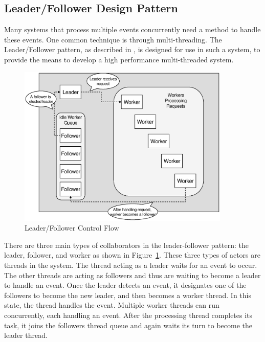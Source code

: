 \subsection{Leader/Follower Design Pattern}
Many systems that process multiple events concurrently need a method to handle 
these events. One common technique is through multi-threading. The 
Leader/Follower pattern, as described in \cite{GangOf4}, is designed for use in
such a system, to provide the means to develop a high performance multi-threaded
system. 

\begin{figure}
  \begin{center}
  \includegraphics[width=0.9\textwidth]{./images/leaderFollower}
  \caption{Leader/Follower Control Flow}
  \label{fig:leaderFollower}
  \end{center}
\end{figure}

There are three main types of collaborators in the leader-follower pattern: the
leader, follower, and worker as shown in Figure~\ref{fig:leaderFollower}. These
three types of actors are threads in the system. The thread acting as a leader 
waits for an event to occur. The other threads are acting as followers and thus
are waiting to become a leader to handle an event. Once the leader detects an 
event, it designates one of the followers to become the new leader, and then 
becomes a worker thread. In this state, the thread handles the event.  Multiple
worker threads can run concurrently, each handling an event. After the 
processing thread completes its task, it joins the followers thread queue and
again waits its turn to become the leader thread.

